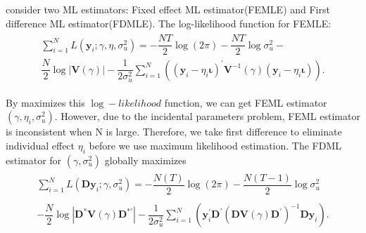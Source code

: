 \documentclass[12pt,a4paper,hyperref]{article}
\begin{document}
\citet{Kruiniger:2008} consider two ML estimators: Fixed effect ML estimator(FEMLE) and First difference ML estimator(FDMLE).
The log-likelihood function for FEMLE:
\begin{align}
\begin{split}
\sum^{N}_{i=1}L(\boldsymbol{y}_{i}; \gamma, \eta, \sigma^{2}_{u})=-\dfrac{NT}{2}\log(2\pi)-\dfrac{NT}{2}\log \sigma^{2}_{u}- \\
\dfrac{N}{2} \log \left \vert \boldsymbol{V}(\gamma) \right \vert -\dfrac{1}{2 \sigma^{2}_{u}} \sum^{N}_{i=1}((\boldsymbol{y}_{i}-\eta_{i}\boldsymbol{\iota})^{'}\boldsymbol{V}^{-1}(\gamma)(\boldsymbol{y}_{i}-\eta_{i}\boldsymbol{\iota})).
\end{split}
\end{align}

By maximizes this $\log-likelihood$ function, we can get FEML estimator $\left( \gamma, \eta_{i}, \sigma^{2}_{u} \right)$.
However, due to the incidental parameters problem, FEML estimator is inconsistent when N is large.
Therefore, we take first difference to eliminate individual effect $\eta_{i}$ before we use maximum likelihood estimation.
The FDML estimator for $\left(\gamma, \sigma^{2}_{u} \right)$ globally maximizes
\begin{align}
\begin{split}
\sum^{N}_{i=1} L (\boldsymbol{D}\boldsymbol{y}_{i}; \gamma, \sigma^{2}_{u})= -\dfrac{N(T)}{2} \log (2\pi)-\dfrac{N(T-1)}{2} \log \sigma^{2}_{u} \\
\\
-\dfrac{N}{2} \log \left\vert \boldsymbol{D}^{\ast}\boldsymbol{V}(\gamma)  \boldsymbol{D}^{\ast'} \right\vert-\dfrac{1}{2\sigma^{2}_{u}} \sum^{N}_{i=1}(\boldsymbol{y}^{'}_{i} \boldsymbol{D}^{'} (\boldsymbol{D}\boldsymbol{V}(\gamma)  \boldsymbol{D}^{'})^{-1} \boldsymbol{D}\boldsymbol{y}_{i}).
\end{split}
\end{align}
\end{document}
